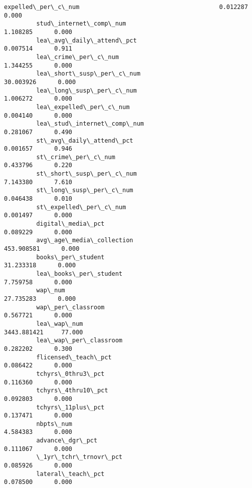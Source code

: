 \documentclass[11pt]{article}
\begin{document}
\begin{Verbatim}[commandchars=\\\{\}]
         expelled\_per\_c\_num                                       0.012287      0.000   
         stud\_internet\_comp\_num                                   1.108285      0.000   
         lea\_avg\_daily\_attend\_pct                                 0.007514      0.911   
         lea\_crime\_per\_c\_num                                      1.344255      0.000   
         lea\_short\_susp\_per\_c\_num                                30.003926      0.000   
         lea\_long\_susp\_per\_c\_num                                  1.006272      0.000   
         lea\_expelled\_per\_c\_num                                   0.004140      0.000   
         lea\_stud\_internet\_comp\_num                               0.281067      0.490   
         st\_avg\_daily\_attend\_pct                                  0.001657      0.946   
         st\_crime\_per\_c\_num                                       0.433796      0.220   
         st\_short\_susp\_per\_c\_num                                  7.143380      7.610   
         st\_long\_susp\_per\_c\_num                                   0.046438      0.010   
         st\_expelled\_per\_c\_num                                    0.001497      0.000   
         digital\_media\_pct                                        0.089229      0.000   
         avg\_age\_media\_collection                               453.908581      0.000   
         books\_per\_student                                       31.233318      0.000   
         lea\_books\_per\_student                                    7.759758      0.000   
         wap\_num                                                 27.735283      0.000   
         wap\_per\_classroom                                        0.567721      0.000   
         lea\_wap\_num                                           3443.881421     77.000   
         lea\_wap\_per\_classroom                                    0.282202      0.300   
         flicensed\_teach\_pct                                      0.086422      0.000   
         tchyrs\_0thru3\_pct                                        0.116360      0.000   
         tchyrs\_4thru10\_pct                                       0.092803      0.000   
         tchyrs\_11plus\_pct                                        0.137471      0.000   
         nbpts\_num                                                4.584383      0.000   
         advance\_dgr\_pct                                          0.111067      0.000   
         \_1yr\_tchr\_trnovr\_pct                                     0.085926      0.000   
         lateral\_teach\_pct                                        0.078500      0.000   

\end{Verbatim}
\end{document}
